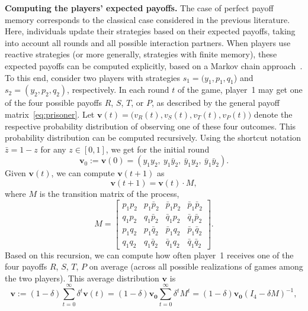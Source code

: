 \documentclass[11pt]{article}
\def\strategy{s}
\theoremstyle{plainCl1}
\theoremstyle{plainCl2}
\begin{document}
{\bf Computing the players' expected payoffs.}
The case of perfect payoff memory corresponds to the classical case considered in the previous literature. 
Here, individuals update their strategies based on their expected payoffs, taking into account all rounds and all possible interaction partners. 
When players use reactive strategies (or more generally, strategies with finite memory), these expected payoffs can be computed explicitly, based on a Markov chain approach~\cite{sigmund2010calculus}. 
To this end, consider two players with strategies $\strategy_1\!=\!(y_1, p_1, q_1$) and $\strategy_2\!=\!(y_2,p_2,q_2)$, respectively. 
In each round $t$ of the game, player~1 may get one of the four possible payoffs $R$, $S$, $T$, or $P$, as described by the general payoff matrix~\eqref{eq:prisoner}. 
Let $\mathbf{v}(t)\!=\!\big(v_R(t),v_S(t),v_T(t),v_P(t)\big)$ denote the respective probability distribution of observing one of these four outcomes.  
This probability distribution can be computed recursively. 
Using the shortcut notation $\bar{z}\!=\!1\!-\!z$ for any $z\!\in\![0,1]$, we get for the initial round 
\begin{equation} \label{Eq:v0}
\mathbf{v}_0:=\mathbf{v}(0) = (y_1 y_2,~y_1 \bar{y}_2,~\bar{y}_1 y_2,~\bar{y}_1 \bar{y}_2).
\end{equation}
Given $\mathbf{v}(t)$, we can compute $\mathbf{v}(t\!+\!1)$ as  
\begin{equation} \label{Eq:vt}
\mathbf{v}(t\!+\!1) = \mathbf{v}(t)\cdot M,
\end{equation}
where $M$ is the transition matrix of the process, 
\begin{equation} \label{eq:transition_matrix}
M=\left[
\begin{array}{llll}
p_1 p_2	&p_1 \bar{p}_2	&\bar{p}_1 p_2	&\bar{p}_1\bar{p}_2\\
q_1 p_2	&q_1 \bar{p}_2 &\bar{q}_1 p_2	&\bar{q}_1\bar{p}_2\\
p_1 q_2	&p_1 \bar{q}_2	&\bar{p}_1 q_2	&\bar{p}_1\bar{q}_2\\
q_1 q_2	&q_1 \bar{q}_2	&\bar{q}_1 q_2	&\bar{q}_1\bar{q}_2
\end{array}
\right].
\end{equation}
Based on this recursion, we can compute how often player~1 receives one of the four payoffs $R$, $S$, $T$, $P$ on average (across all possible realizations of games among the two players). This average distribution $\mathbf{v}$ is
\begin{equation} \label{Eq:vDefinition}
\mathbf{v} := (1\!-\!\delta) \sum_{t=0}^\infty \delta^t \mathbf{v}(t) 
= (1\!-\!\delta) \mathbf{v_0} \sum_{t=0}^\infty \delta^t M^t
= (1\!-\!\delta) \mathbf{v_0} (I_4-\delta M)^{-1},
\end{equation}
\end{document}
